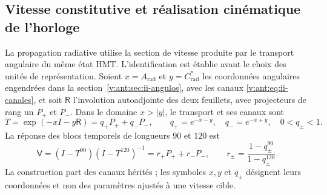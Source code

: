\subsection{Vitesse constitutive et réalisation cinématique de l’horloge}
\label{v:sec:enlace-velocidad-constitutiva}

La propagation radiative utilise la section de vitesse produite par le
transport angulaire du même état HMT. L’identification est établie
avant le choix des unités de représentation. Soient $x=A_{\mathrm{rad}}$ et
$y=C^*_{\mathrm{rad}}$ les coordonnées angulaires engendrées dans la
section~\ref{v:ant:sec:ii-angulos}, avec les canaux
\eqref{v:ant:eq:ii-canales}, et soit
$\mathsf R$ l’involution autoadjointe des deux feuillets, avec projecteurs
de rang un $P_+$ et $P_-$. Dans le domaine $x>|y|$, le transport et ses
canaux sont
\begin{equation}
 T=\exp(-xI-y\mathsf R)=q_+P_++q_-P_-,
 \qquad q_+=e^{-x-y},\quad q_-=e^{-x+y},\quad 0<q_\pm<1.
 \label{v:eq:velocidad-transporte}
\end{equation}
La réponse des blocs temporels de longueurs $90$ et $120$ est
\begin{equation}
 \mathsf V=(I-T^{90})(I-T^{120})^{-1}
       =r_+P_++r_-P_-,\qquad
 r_\pm=\frac{1-q_\pm^{90}}{1-q_\pm^{120}}.
 \label{v:eq:velocidad-respuesta}
\end{equation}
La construction part des canaux hérités ; les symboles $x,y$ et
$q_\pm$ désignent leurs coordonnées et non des paramètres ajustés à une vitesse
cible.

